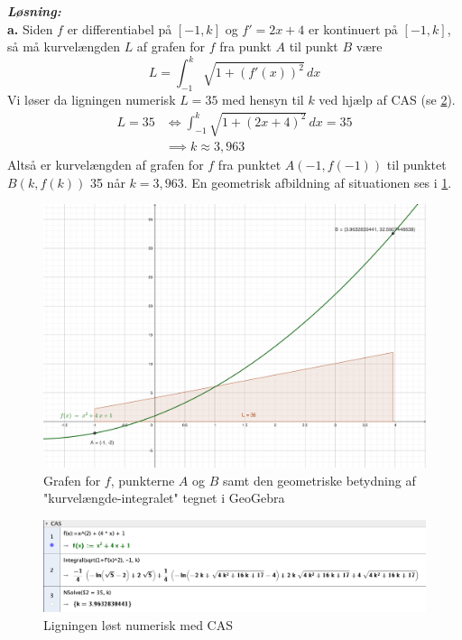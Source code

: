 \documentclass{article}
\newcommand{\sol}{\setlength{\parindent}{0cm}\textbf{\textit{Løsning:}}\setlength{\parindent}{1cm}}
\begin{document}
\sol \\
\textbf{a.}
Siden $f$ er differentiabel på $[-1,k]$ og $f'=2x+4$ er kontinuert på $[-1,k]$, så må kurvelængden $L$ af grafen for $f$ fra punkt $A$ til punkt $B$ være
\[
L=\int_{-1}^{k} \sqrt{1+\left(f'(x)\right)^2}  \,dx 
\] 
Vi løser da ligningen numerisk $L=35$ med hensyn til $k$ ved hjælp af CAS (se \cref{fig:CAS}).
\begin{equation*}
\begin{split}
  L=35 &\iff \int_{-1}^{k} \sqrt{1+\left(2x+4\right)^2}  \,dx =35\\
  &\implies k \approx 3,963
\end{split}
\end{equation*}
Altså er kurvelængden af grafen for $f$ fra punktet $A(-1,f(-1))$ til punktet $B(k,f(k))$ 35 når $k=3,963$.
En geometrisk afbildning af situationen ses i \cref{fig:graph}.
\begin{figure}[H]
\begin{center}
  \includegraphics[scale=0.25]{graph.png}
\end{center}
\caption{Grafen for $f$, punkterne $A$ og $B$ samt den geometriske betydning af "kurvelængde-integralet" tegnet i GeoGebra}
\label{fig:graph}
\end{figure}

\begin{figure}[H]
\begin{center}
  \includegraphics[scale=0.4]{CAS.png}
\end{center}
\caption{Ligningen løst numerisk med CAS}
\label{fig:CAS}
\end{figure}
\end{document}
